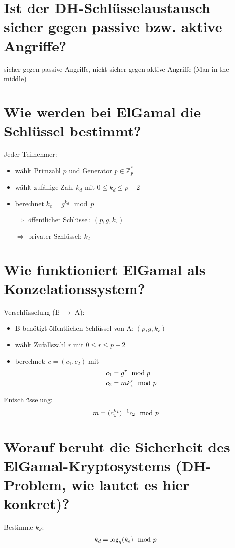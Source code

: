 \documentclass{article}
\begin{document}
	\section*{Ist der DH-Schlüsselaustausch sicher gegen passive bzw. aktive Angriffe?}
	sicher gegen passive Angriffe, nicht sicher gegen aktive Angriffe (Man-in-the-middle)
	
	\section*{Wie werden bei ElGamal die Schlüssel bestimmt?}
	Jeder Teilnehmer:
	\begin{itemize}
		\item wählt Primzahl $p$ und Generator $p\in\mathbb{Z}_p^\ast$
		\item wählt zufällige Zahl $k_d$ mit $0\le k_d\le p-2$
		\item berechnet $k_e = g^{k_d}\mod p$
		\item[$\Rightarrow$] öffentlicher Schlüssel: $(p,g,k_e)$
		\item[$\Rightarrow$] privater Schlüssel: $k_d$
	\end{itemize}
	
	\section*{Wie funktioniert ElGamal als Konzelationssystem?}
	Verschlüsselung (B $\to$ A):
	\begin{itemize}
		\item B benötigt öffentlichen Schlüssel von A: $(p,g,k_e)$
		\item wählt Zufallszahl $r$ mit $0\le r\le p-2$
		\item berechnet: $c = (c_1,c_2)$ mit
		\begin{align}
			c_1 &= g^r\mod p \notag \\
			c_2 &= mk_e^r\mod p \notag
		\end{align}
	\end{itemize}
	Entschlüsselung:
	\begin{align}
		m = (c_1^{k_d})^{-1}c_2\mod p \notag
	\end{align}
	
	\section*{Worauf beruht die Sicherheit des ElGamal-Kryptosystems (DH-Problem, wie lautet es hier konkret)?}
	Bestimme $k_d$:
	\begin{align}
		k_d = \log_g(k_e)\mod p \notag
	\end{align}
	
\end{document}
